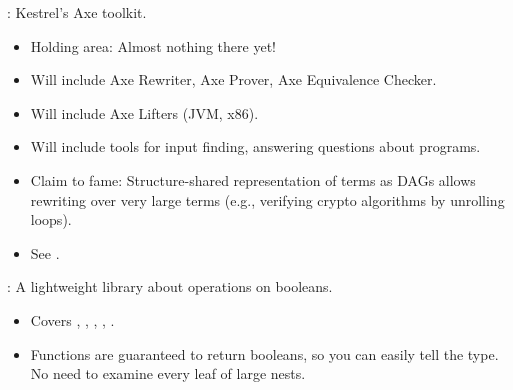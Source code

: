 \begin{frame}

\newlibtitle

:
Kestrel's Axe toolkit.
\begin{itemize}
\item Holding area: Almost nothing there yet!
\item Will include Axe Rewriter, Axe Prover, Axe Equivalence Checker.
\item Will include Axe Lifters (JVM, x86).
\item Will include tools for input finding, answering questions about programs.
\item Claim to fame: Structure-shared representation of terms as DAGs allows
  rewriting over very large terms (e.g., verifying crypto algorithms by
  unrolling loops).
\item See .
\end{itemize}

\separation

:
A lightweight library about operations on booleans.
\begin{itemize}
\item Covers , , , , .
\item Functions are guaranteed to return booleans, so you can easily tell the
  type.  No need to examine every leaf of large nests.
\end{itemize}

\end{frame}


